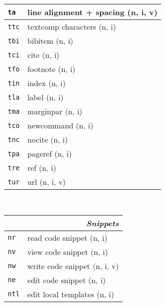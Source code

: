 \documentclass[oneside,10pt,landscape,DIV16]{scrartcl}
\newcommand{\Map}[1] {\textbf{\textasciiacute}\texttt{#1}}
\begin{document}
\begin{multicols}{3}
\begin{center}
\begin{tabular}[]{|p{11mm}|p{60mm}|}
\hline \Map{ta}   & line alignment + spacing       \hfill (n, i, v)\\
\hline \Map{ttc}  & textcomp characters            \hfill (n, i)\\
\hline
\hline \Map{tbi}  & bibitem                        \hfill (n, i)\\
\hline \Map{tci}  & cite                           \hfill (n, i)\\
\hline \Map{tfo}  & footnote                       \hfill (n, i)\\
\hline \Map{tin}  & index                          \hfill (n, i)\\
\hline \Map{tla}  & label                          \hfill (n, i)\\
\hline \Map{tma}  & marginpar                      \hfill (n, i)\\
\hline \Map{tco}  & newcommand                     \hfill (n, i)\\
\hline \Map{tnc}  & nocite                         \hfill (n, i)\\
\hline \Map{tpa}  & pageref                        \hfill (n, i)\\
\hline \Map{tre}  & ref                            \hfill (n, i)\\
\hline \Map{tur}  & url                            \hfill (n, i, v)\\
\hline
%
\end{tabular}\\
%
\begin{tabular}[]{|p{11mm}|p{62mm}|}
\hline
\multicolumn{2}{|r|}{\textsl{S\textbf{n}ippets}}                \\[1.0ex]
\hline \Map{nr}  & read code snippet         \hfill (n, i)   \\
\hline \Map{nv}  & view code snippet         \hfill (n, i)   \\
\hline \Map{nw}  & write code snippet        \hfill (n, i, v)\\
\hline \Map{ne}  & edit code snippet         \hfill (n, i)   \\
\hline
\hline \Map{ntl} & edit local templates      \hfill (n, i)   \\

\end{tabular}
\end{center}
\end{multicols}
\end{document}
